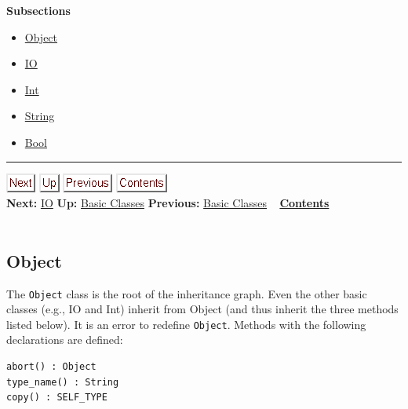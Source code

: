 \documentclass[]{article}
\begin{document}
\textbf{Subsections}

\begin{itemize}
\itemsep1pt\parskip0pt
\item
  \href{node27.html}{Object}
\item
  \href{node28.html}{IO}
\item
  \href{node29.html}{Int}
\item
  \href{node30.html}{String}
\item
  \href{node31.html}{Bool}
\end{itemize}

\begin{center}\rule{3in}{0.4pt}\end{center}

\href{node28.html}{\includegraphics{next.png}}
\href{node26.html}{\includegraphics{up.png}}
\href{node26.html}{\includegraphics{prev.png}}
\href{node1.html}{\includegraphics{contents.png}} \\ \textbf{Next:}
\href{node28.html}{IO} \textbf{Up:} \href{node26.html}{Basic Classes}
\textbf{Previous:} \href{node26.html}{Basic Classes} ~
\textbf{\href{node1.html}{Contents}} \\ \\

\subsection{Object}

The \texttt{Object} class is the root of the inheritance graph. Even the
other basic classes (e.g., IO and Int) inherit from Object (and thus
inherit the three methods listed below). It is an error to redefine
\texttt{Object}. Methods with the following declarations are defined:

\begin{verbatim}
abort() : Object
type_name() : String
copy() : SELF_TYPE
\end{verbatim}
\end{document}
